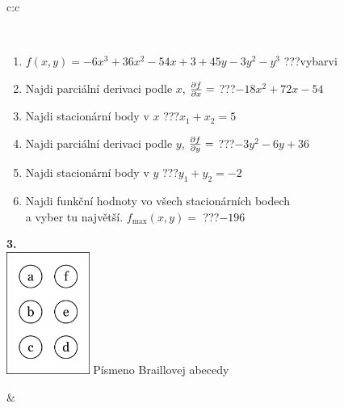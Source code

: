 \documentclass[10pt]{report}
\begin{document}
\begin{tabular}{c:c}
\begin{minipage}[c][104.5mm][t]{0.5\linewidth}
\begin{center}
\begin{minipage}{0.95\linewidth}
\begin{center}
\end{center}
\end{minipage}
\\[1mm]
\begin{minipage}{0.79\linewidth}
\begin{center}
\begin{varwidth}{\linewidth}
\begin{enumerate}
\normalsize
\item $f(x,y)=-6x^3+36x^2-54x+3+45y-3y^2-y^3$\quad \dotfill\; ???\;\dotfill \quad vybarvi
\item Najdi parciální derivaci podle $x$, $\pdv{f}{x}=$\quad \dotfill\; ???\;\dotfill \quad $-18x^2+72x-54$
\item Najdi stacionární body v $x$\quad \dotfill\; ???\;\dotfill \quad $x_1+x_2=5$
\item Najdi parciální derivaci podle $y$, $\pdv{f}{y}=$\quad \dotfill\; ???\;\dotfill \quad $-3y^2-6y+36$
\item Najdi stacionární body v $y$\quad \dotfill\; ???\;\dotfill \quad $y_1+y_2=-2$
\item Najdi funkční hodnoty vo všech stacionárních bodech \\ \phantom{xxxxxx} a vyber tu najvětší. $f_{\text{max}}(x,y)=$\quad \dotfill\; ???\;\dotfill \quad $-196$
\end{enumerate}
\end{varwidth}
\end{center}
\end{minipage}
\begin{minipage}{0.20\linewidth}
\begin{center}
{\Huge\bfseries 3.} \\[2mm]
\includegraphics[height=40mm]{../images/braille.png}
{\small Písmeno Braillovej abecedy}
\end{center}
\end{minipage}
\end{center}
\end{minipage}
&
\begin{minipage}[c][104.5mm][t]{0.5\linewidth}
\begin{center}

\end{center}
\end{minipage}
\end{tabular}
\end{document}
